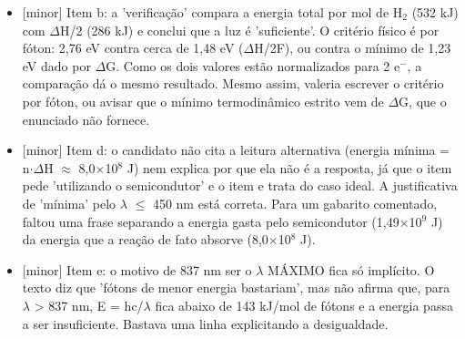 \documentclass{article}%
\begin{document}
\begin{itemize}%
\item%
{[}minor{]} Item b: a 'verificação' compara a energia total por mol de H$_{2}$ (532 kJ) com $\Delta$H/2 (286 kJ) e conclui que a luz é 'suficiente'. O critério físico é por fóton: 2,76 eV contra cerca de 1,48 eV ($\Delta$H/2F), ou contra o mínimo de 1,23 eV dado por $\Delta$G. Como os dois valores estão normalizados para 2 e$^{-}$, a comparação dá o mesmo resultado. Mesmo assim, valeria escrever o critério por fóton, ou avisar que o mínimo termodinâmico estrito vem de $\Delta$G, que o enunciado não fornece.%
\item%
{[}minor{]} Item d: o candidato não cita a leitura alternativa (energia mínima = n$\cdot$$\Delta$H $\approx$ 8,0$\times$10$^{8}$ J) nem explica por que ela não é a resposta, já que o item pede 'utilizando o semicondutor' e o item e trata do caso ideal. A justificativa de 'mínima' pelo $\lambda$ $\leq$ 450 nm está correta. Para um gabarito comentado, faltou uma frase separando a energia gasta pelo semicondutor (1,49$\times$10$^{9}$ J) da energia que a reação de fato absorve (8,0$\times$10$^{8}$ J).%
\item%
{[}minor{]} Item e: o motivo de 837 nm ser o $\lambda$ MÁXIMO fica só implícito. O texto diz que 'fótons de menor energia bastariam', mas não afirma que, para $\lambda$ > 837 nm, E = hc/$\lambda$ fica abaixo de 143 kJ/mol de fótons e a energia passa a ser insuficiente. Bastava uma linha explicitando a desigualdade.%
\end{itemize}%
\end{document}
